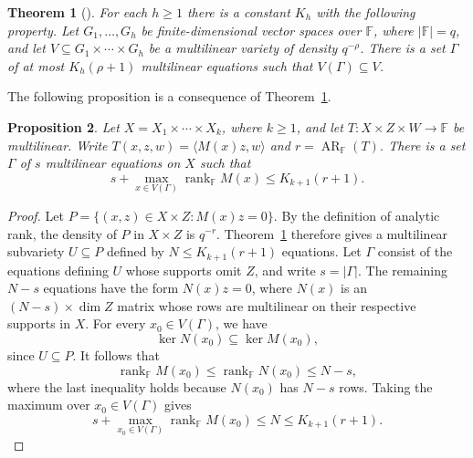 \documentclass[11pt,reqno]{amsart}
\theoremstyle{plain}
\newtheorem{theorem}{Theorem}[section]
\newtheorem{proposition}[theorem]{Proposition}
\theoremstyle{definition}
\newcommand{\F}{\mathbb F}
\DeclareMathOperator{\arank}{AR}
\DeclareMathOperator{\rk}{rank}
\begin{document}
\begin{theorem}[{\cite[Theorem~2]{Milicevic}}]\label{thm:weak}
For each $h\geq 1$ there is a constant $K_h$ with the following property.
Let $G_1,\ldots,G_h$ be finite-dimensional vector spaces over $\F$,
where $|\F|=q$, and let $V\subseteq G_1\times\cdots\times G_h$ be a
multilinear variety of density $q^{-\rho}$. There is a set $\Gamma$ of
at most $K_h(\rho+1)$ multilinear equations such that $V(\Gamma)\subseteq V$.
\end{theorem}
The following proposition is a consequence of Theorem~\ref{thm:weak}.
\begin{proposition}\label{prop:fibers}
Let $X=X_1\times\cdots\times X_k$, where $k\geq1$, and let
$T\colon X\times Z\times W\to\F$ be multilinear. Write
$T(x,z,w)=\langle M(x)z,w\rangle$ and $r=\arank_{\F}(T)$.
There is a set $\Gamma$ of $s$ multilinear equations on $X$ such that
\[
 s+\max_{x\in V(\Gamma)}\rk_{\F}M(x)\leq K_{k+1}(r+1).
\]
\end{proposition}

\begin{proof}
Let $P=\{(x,z)\in X\times Z:M(x)z=0\}$. By the definition of analytic rank, the density of $P$ in $X\times Z$ is $q^{-r}$.
Theorem~\ref{thm:weak} therefore gives a multilinear subvariety $U\subseteq P$ defined
by $N\leq K_{k+1}(r+1)$ equations. Let $\Gamma$ consist of the
equations defining $U$ whose supports omit $Z$, and write $s=|\Gamma|$.
The remaining $N-s$ equations have the form $N(x)z=0$, where $N(x)$ is
an $(N-s)\times\dim Z$ matrix whose rows are multilinear on their respective supports in $X$.
For every $x_0\in V(\Gamma)$, we have
\[
 \ker N(x_0)\subseteq\ker M(x_0),
\]
since $U\subseteq P$. It follows that
\[
 \rk_{\F}M(x_0)\leq \rk_{\F}N(x_0)\leq N-s,
\]
where the last inequality holds because $N(x_0)$ has $N-s$ rows.
Taking the maximum over $x_0\in V(\Gamma)$ gives
\[
 s+\max_{x_0\in V(\Gamma)}\rk_{\F}M(x_0)
 \leq N\leq K_{k+1}(r+1).
\]
\end{proof}
\end{document}
